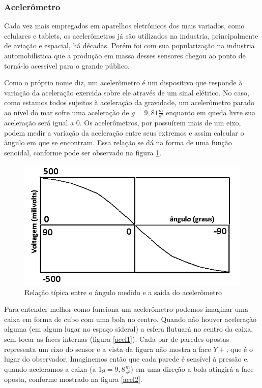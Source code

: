 \documentclass[a4paper,12pt]{article}
\begin{document}
\subsubsection{Acelerômetro}

Cada vez mais empregados em aparelhos eletrônicos dos mais variados, como celulares e tablets, os acelerômetros já são utilizados na industria, principalmente de aviação e espacial, há décadas. Porém foi com sua popularização na industria automobilística que a produção em massa desses sensores chegou ao ponto de torná-lo acessível para o grande público.

Como o próprio nome diz, um acelerômetro é um dispositivo que responde à variação da aceleração exercida sobre ele através de um sinal elétrico. No caso, como estamos todos sujeitos à aceleração da gravidade, um acelerômetro parado ao nível do mar sofre uma aceleraçào de $g=9,81 \frac{m}{s^2}$ enquanto em queda livre sua aceleração será igual a 0. Os acelerômetros, por possuírem mais de um eixo, podem medir a variação da aceleração entre seus extremos e assim calcular o ângulo em que se encontram. Essa relação se dá na forma de uma função senoidal, conforme pode ser observado na figura \ref{curva}.

\begin{figure}[H]
\centering
\includegraphics[width=.6\textwidth]{img/curva.png}
\caption{Relação típica entre o ângulo medido e a saída do acelerômetro}
\label{curva}
\end{figure}

Para entender melhor como funciona um acelerômetro podemos imaginar uma caixa em forma de cubo com uma bola no centro. Quando não houver aceleração alguma (em algum lugar no espaço sideral) a esfera flutuará no centro da caixa, sem tocar as faces internas (figura \ref{acel1}). Cada par de paredes opostas representa um eixo do sensor e a vista da figura não mostra a face $Y+$, que é o lugar do observador. Imaginemos então que cada parede é sensível à pressão e, quando aceleramos a caixa (a $1g = 9,8 \frac{m}{s^2}$) em uma direção a bola atingirá a face oposta, conforme mostrado na figura \ref{acel2}.
\end{document}
